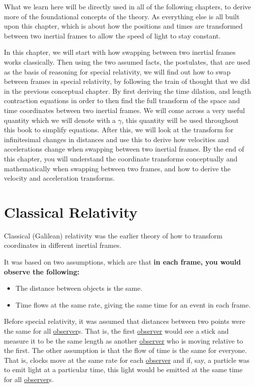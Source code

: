 What we learn here will be directly used in all of the following chapters, to derive more of the foundational concepts of the theory.
As everything else is all built upon this chapter, which is about how the positions and times are transformed between two inertial frames to allow the speed of light to stay constant.

In this chapter, we will start with how swapping between two inertial frames works classically.
Then using the two assumed facts, the postulates, that are used as the basis of reasoning for special relativity, we will find out how to swap between frames in special relativity, by following the train of thought that we did in the previous conceptual chapter.
By first deriving the time dilation, and length contraction equations in order to then find the full transform of the space and time coordinates between two inertial frames.
We will come across a very useful quantity which we will denote with a ${\gamma}$, this quantity will be used throughout this book to simplify equations.
After this, we will look at the transform for infinitesimal changes in distances and use this to derive how velocities and accelerations change when swapping between two inertial frames.
By the end of this chapter, you will understand the coordinate transforms conceptually and mathematically when swapping between two frames, and how to derive the velocity and acceleration transforms.

\section{Classical Relativity} \label{sect: Classical Relativity}

Classical (Galilean) relativity was the earlier theory of how to transform coordinates in different inertial frames.

It was based on two assumptions, which are that \textbf{in each frame, you would observe the following:}

\begin{itemize}
	\item The distance between objects is the same.
	\item Time flows at the same rate, giving the same time for an event in each frame.
\end{itemize}

Before special relativity, it was assumed that distances between two points were the same for all \hyperlink{def-observer}{observer}s.
That is, the first \hyperlink{def-observer}{observer} would see a stick and measure it to be the same length as another \hyperlink{def-observer}{observer} who is moving relative to the first.
The other assumption is that the flow of time is the same for everyone.
That is, clocks move at the same rate for each \hyperlink{def-observer}{observer} and if, say, a particle was to emit light at a particular time, this light would be emitted at the same time for all \hyperlink{def-observer}{observer}s.

